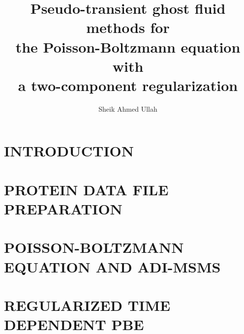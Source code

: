 \documentclass[dissertation]{uathesis}
\author{Sheik Ahmed Ullah}       %
\title{Pseudo-transient ghost fluid methods for\protect\\ the Poisson-Boltzmann equation with \protect\\a two-component regularization}
\begin{document}
\makefrontmatter


\begin{body}

\chapter{INTRODUCTION}
\label{chap: introduction}

\chapter{PROTEIN DATA FILE PREPARATION}
\label{chap: protein_data}
 

% 
\chapter{POISSON-BOLTZMANN EQUATION AND ADI-MSMS}
\label{chap: PBE}


\chapter{REGULARIZED TIME DEPENDENT PBE }
\label{chap:opt_split}


\end{body}
\end{document}
